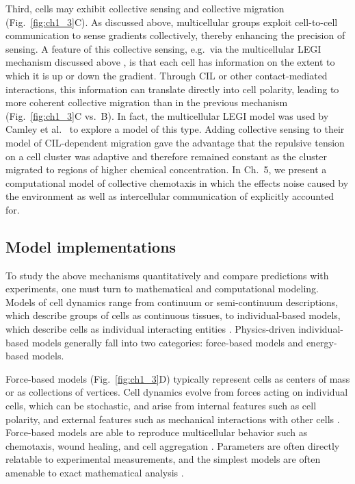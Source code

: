 Third, cells may exhibit collective sensing and collective migration (Fig.\ \ref{fig:ch1_3}C). As discussed above, multicellular groups exploit cell-to-cell communication to sense gradients collectively, thereby enhancing the precision of sensing. A feature of this collective sensing, e.g.\ via the multicellular LEGI mechanism discussed above \cite{ellison2016cell, mugler2016limits}, is that each cell has information on the extent to which it is up or down the gradient. Through CIL or other contact-mediated interactions, this information can translate directly into cell polarity, leading to more coherent collective migration than in the previous mechanism (Fig.\ \ref{fig:ch1_3}C vs.\ B).
In fact, the multicellular LEGI model was used by Camley et al.\ \cite{camley2016emergent} to explore a model of this type. Adding collective sensing to their model of CIL-dependent migration gave the advantage that the repulsive tension on a cell cluster was adaptive and therefore remained constant as the cluster migrated to regions of higher chemical concentration. In Ch.\ 5, we present a computational model of collective chemotaxis in which the effects noise caused by the environment as well as intercellular communication of explicitly accounted for.

\subsection{Model implementations}

To study the above mechanisms quantitatively and compare predictions with experiments, one must turn to mathematical and computational modeling. Models of cell dynamics range from continuum or semi-continuum descriptions, which describe groups of cells as continuous tissues, to individual-based models, which describe cells as individual interacting entities \cite{shao2010computational,maclaren2015models,camley2017physical}.
Physics-driven individual-based models generally fall into two categories: force-based models and energy-based models.

Force-based models (Fig.\ \ref{fig:ch1_3}D) typically represent cells as centers of mass or as collections of vertices. Cell dynamics evolve from forces acting on individual cells, which can be stochastic, and arise from internal features such as cell polarity, and external features such as mechanical interactions with other cells \cite{maclaren2015models}.
Force-based models are able to reproduce multicellular behavior such as chemotaxis, wound healing, and cell aggregation \cite{camley2016emergent,basan2013alignment,janulevicius2015short}. Parameters are often directly relatable to experimental measurements, and the simplest models are often amenable to exact mathematical analysis \cite{camley2016emergent}.

